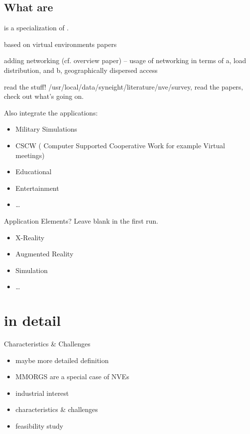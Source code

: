 \subsection{What are \NVES}

\MMORG is a specialization of \NVE.

based on virtual environments papers

adding networking (cf. overview paper) -- usage of networking in terms
of a, load distribution, and b, geographically dispersed access

read the stuff! /usr/local/data/syneight/literature/nve/survey, read
the papers, check out what's going on.

Also integrate the applications:
\begin{itemize}
        \item Military Simulations
        \item CSCW ( Computer Supported Cooperative Work for example
              Virtual meetings)
        \item Educational
        \item Entertainment
        \item \dots
\end{itemize}

Application Elements? Leave blank in the first run.
\begin{itemize}
        \item X-Reality
        \item Augmented Reality
        \item Simulation
        \item \dots
\end{itemize}

\section{\MMORGS in detail}
Characteristics \& Challenges
\begin{itemize}
	\item maybe more detailed definition
	\item MMORGS are a special case of NVEs
	\item industrial interest
	\item characteristics \& challenges
	\item feasibility study
\end{itemize}


